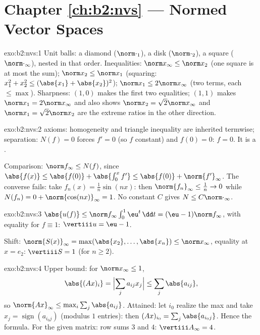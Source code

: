 \section*{Chapter \ref{ch:b2:nvs} --- Normed Vector Spaces}

\begin{solution}{exo:b2:nvs:1}
Unit balls: a diamond ($\norm\cdot_1$), a disk ($\norm\cdot_2$), a
square ($\norm\cdot_\infty$), nested in that order. Inequalities:
$\norm x_\infty \leq \norm x_2$ (one square is at most the sum);
$\norm x_2 \leq \norm x_1$ (squaring: $x_1^2 + x_2^2 \leq (\abs{x_1}
+ \abs{x_2})^2$); $\norm x_1 \leq 2\norm x_\infty$ (two terms, each
$\leq \max$). Sharpness: $(1, 0)$ makes the first two equalities;
$(1, 1)$ makes $\norm x_1 = 2\norm x_\infty$ and also shows
$\norm x_2 = \sqrt2 \norm x_\infty$ and $\norm x_1 = \sqrt2 \norm
x_2$ are the extreme ratios in the other direction.
\end{solution}

\begin{solution}{exo:b2:nvs:2}
 axioms: homogeneity and triangle inequality are inherited
termwise; separation: $N(f) = 0$ forces $f' = 0$ (so $f$ constant)
and $f(0) = 0$: $f = 0$. It is a .

Comparison: $\norm f_\infty \leq N(f)$, since $\abs{f(x)} \leq
\abs{f(0)} + \abs{\int_0^x f'} \leq \abs{f(0)} +
\norm{f'}_\infty$. The converse fails: take $f_n(x) = \frac1n
\sin(nx)$: then $\norm{f_n}_\infty \leq \frac1n \to 0$ while
$N(f_n) = 0 + \norm{\cos(nx)}_\infty = 1$. No constant $C$ gives
$N \leq C\norm\cdot_\infty$.
\end{solution}

\begin{solution}{exo:b2:nvs:3}
$\abs{u(f)} \leq \norm f_\infty \int_0^1 \eu^t\,\dd t = (\eu -
1)\norm f_\infty$, with equality for $f \equiv 1$: $\vertiii u =
\eu - 1$.

Shift: $\norm{S(x)}_\infty = \max(\abs{x_2}, \dots, \abs{x_n}) \leq
\norm x_\infty$, equality at $x = e_2$: $\vertiii S = 1$ (for $n
\geq 2$).
\end{solution}

\begin{solution}{exo:b2:nvs:4}
Upper bound: for $\norm x_\infty \leq 1$,
\[
\abs{(Ax)_i} = \Bigl|\sum_j a_{ij}x_j\Bigr| \leq \sum_j
\abs{a_{ij}},
\]
so $\norm{Ax}_\infty \leq \max_i \sum_j \abs{a_{ij}}$. Attained: let
$i_0$ realize the max and take $x_j = \operatorname{sign}(a_{i_0
j})$ (modulus $1$ entries): then $(Ax)_{i_0} = \sum_j \abs{a_{i_0
j}}$. Hence the formula. For the given matrix: row sums $3$ and
$4$: $\vertiii A_\infty = 4$.
\end{solution}

